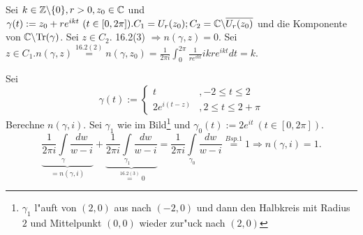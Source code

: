 \documentclass[a4paper,twoside,DIV15,BCOR12mm]{scrbook}
\def\Tr{\text{Tr}}
\def\wegint{\ensuremath{\int\limits_\gamma}}
\begin{document}
\begin{beispiele}
\item Sei $k \in \mathbb{Z} \backslash \{ 0 \}, r>0, z_0 \in \mathbb{C}$ und $\gamma(t) := z_0 + re^{ikt} \ (t \in [0,2\pi]). C_1 = U_r(z_0); C_2 = \mathbb{C} \backslash \overline{U_r(z_0)}$ und die Komponente von $\MdC \backslash \Tr(\gamma)$. Sei $z \in C_2.$ 16.2(3) $\Rightarrow n(\gamma,z)=0.$ Sei $z \in C_1. n(\gamma,z) \stackrel{16.2(2)}{=} n(\gamma,z_0) = \frac1{2\pi i} \int_0^{2\pi} \frac1{re^{ikt}}ikre^{ikt}dt = k$.
\item Sei
\[
\gamma(t) := \left\{
\begin{array}{cl}
t &, -2 \leq t \leq 2\\
2e^{i(t-z)} &, 2 \leq t \leq 2 + \pi
\end{array} \right.
\]
Berechne $n(\gamma,i)$. Sei $\gamma_1$ wie im Bild\footnote{$\gamma_1$ l"auft von $(2,0)$ aus nach $(-2,0)$ und dann den Halbkreis mit Radius $2$ und Mittelpunkt $(0,0)$ wieder zur"uck nach $(2,0)$}
und $\gamma_0(t) := 2e^{it} \ (t \in [0,2\pi])$.
\[
\underbrace{\frac1{2\pi i} \wegint \frac{dw}{w-i}}_{=n(\gamma,i)} + \underbrace{\frac1{2\pi i} \int\limits_{\gamma_1} \frac{dw}{w-i}}_{\stackrel{16.2(3)}{=}0} = \frac1{2\pi i} \int\limits_{\gamma_0} \frac{dw}{w-i} \stackrel{Bsp.1}{=} 1 \Rightarrow n(\gamma,i) = 1.
\]
\end{beispiele}
\end{document}
